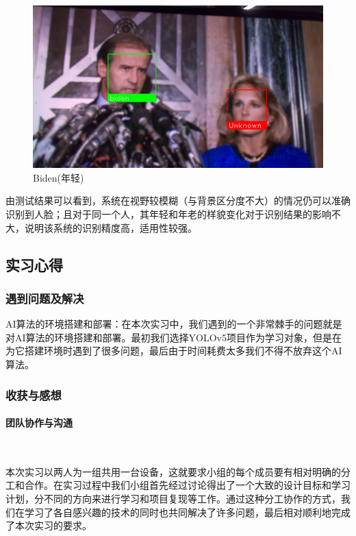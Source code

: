 \documentclass[UTF8]{article}
\begin{document}
\begin{figure}[H]
    \centering %
    \includegraphics[width=.6\textwidth]{figure/效果展示2.png} 
    \caption{Biden(年轻)} %
\end{figure}
由测试结果可以看到，系统在视野较模糊（与背景区分度不大）的情况仍可以准确识别到人脸；且对于同一个人，其年轻和年老的样貌变化对于识别结果的影响不大，说明该系统的识别精度高，适用性较强。

\subsection{实习心得}
\subsubsection{遇到问题及解决}
AI算法的环境搭建和部署：在本次实习中，我们遇到的一个非常棘手的问题就是对AI算法的环境搭建和部署。最初我们选择YOLOv5项目作为学习对象，但是在为它搭建环境时遇到了很多问题，最后由于时间耗费太多我们不得不放弃这个AI算法。

\subsubsection{收获与感想} %

\paragraph{团队协作与沟通}~{}

本次实习以两人为一组共用一台设备，这就要求小组的每个成员要有相对明确的分工和合作。在实习过程中我们小组首先经过讨论得出了一个大致的设计目标和学习计划，分不同的方向来进行学习和项目复现等工作。通过这种分工协作的方式，我们在学习了各自感兴趣的技术的同时也共同解决了许多问题，最后相对顺利地完成了本次实习的要求。
\end{document}
